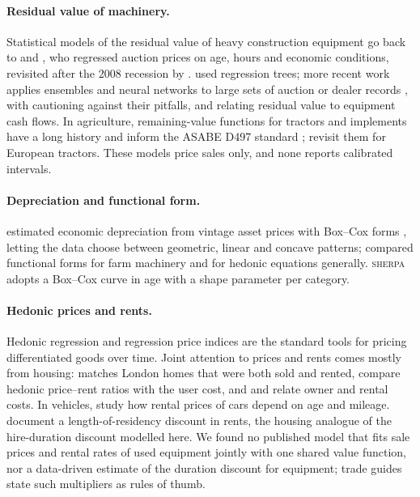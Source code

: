 \documentclass[11pt]{article}
\newcommand{\sherpa}{\textsc{sherpa}}
\begin{document}
\paragraph{Residual value of machinery.}
Statistical models of the residual value of heavy construction equipment go back to
\citet{lucko2006} and \citet{lucko2007}, who regressed auction prices on age, hours and economic
conditions, revisited after the 2008 recession by \citet{lucko2011}. \citet{fan2008} used
regression trees; more recent work applies ensembles and neural networks to large sets of auction
or dealer records \citep{shehadeh2021,alshboul2021,milosevic2021,toma2024}, with
\citet{huymajer2025} cautioning against their pitfalls, and \citet{chiteri2018} relating residual
value to equipment cash flows. In agriculture, remaining-value functions for tractors and
implements have a long history \citep{cross1995,cross1996,dumler2003,wu2004} and inform the ASABE
D497 standard \citep{asabe_d497}; \citet{herranz2023,herranz2024} revisit them for European
tractors. These models price sales only, and none reports calibrated intervals.

\paragraph{Depreciation and functional form.}
\citet{hulten1981} estimated economic depreciation from vintage asset prices with Box--Cox forms
\citep{box1964}, letting the data choose between geometric, linear and concave patterns;
\citet{wu2004} compared functional forms for farm machinery and \citet{halvorsen1981} for hedonic
equations generally. \sherpa{} adopts a Box--Cox curve in age with a shape parameter per category.

\paragraph{Hedonic prices and rents.}
Hedonic regression \citep{rosen1974} and regression price indices \citep{bailey1963} are the
standard tools for pricing differentiated goods over time. Joint attention to prices and rents
comes mostly from housing: \citet{bracke2015} matches London homes that were both sold and rented,
\citet{hill2016} compare hedonic price--rent ratios with the user cost, and \citet{crone2004} and
\citet{garner2009} relate owner and rental costs. In vehicles, \citet{cho2010} study how rental
prices of cars depend on age and mileage. \citet{guasch1987} document a length-of-residency discount
in rents, the housing analogue of the hire-duration discount modelled here. We found no published
model that fits sale prices and rental rates of used equipment jointly with one shared value
function, nor a data-driven estimate of the duration discount for equipment; trade guides state
such multipliers as rules of thumb.
\end{document}
